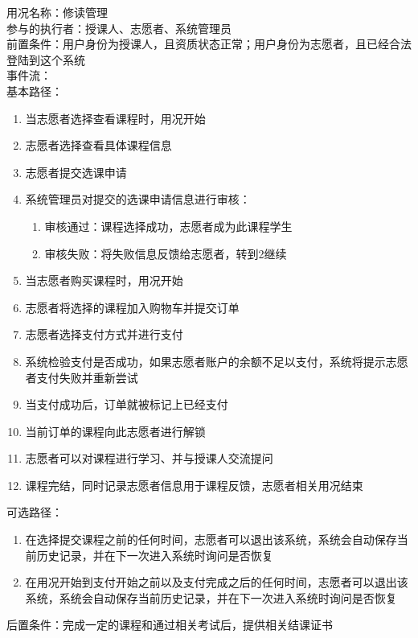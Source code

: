 \begin{framed}
\noindent
用况名称：修读管理\\
参与的执行者：授课人、志愿者、系统管理员\\
前置条件：用户身份为授课人，且资质状态正常；用户身份为志愿者，且已经合法登陆到这个系统\\
事件流：\\
基本路径：
\begin{enumerate}[itemsep=2pt,topsep=0pt,parsep=0pt,itemindent=1em]
    \item 当志愿者选择查看课程时，用况开始
    \item 志愿者选择查看具体课程信息
    \item 志愿者提交选课申请
    \item 系统管理员对提交的选课申请信息进行审核：
    \begin{enumerate}[itemsep=2pt,topsep=0pt,parsep=0pt,itemindent=1em]
          \item 审核通过：课程选择成功，志愿者成为此课程学生
          \item 审核失败：将失败信息反馈给志愿者，转到2继续
      \end{enumerate}
    \item 当志愿者购买课程时，用况开始
    \item 志愿者将选择的课程加入购物车并提交订单
    \item 志愿者选择支付方式并进行支付
    \item 系统检验支付是否成功，如果志愿者账户的余额不足以支付，系统将提示志愿者支付失败并重新尝试
    \item 当支付成功后，订单就被标记上已经支付
    \item 当前订单的课程向此志愿者进行解锁
    \item 志愿者可以对课程进行学习、并与授课人交流提问
    \item 课程完结，同时记录志愿者信息用于课程反馈，志愿者相关用况结束
\end{enumerate}
\noindent
可选路径：\par
         \begin{enumerate}[itemsep=2pt,topsep=0pt,parsep=0pt,itemindent=1em]  \item 在选择提交课程之前的任何时间，志愿者可以退出该系统，系统会自动保存当前历史记录，并在下一次进入系统时询问是否恢复 
         \item 在用况开始到支付开始之前以及支付完成之后的任何时间，志愿者可以退出该系统，系统会自动保存当前历史记录，并在下一次进入系统时询问是否恢复  \end{enumerate} 
后置条件：完成一定的课程和通过相关考试后，提供相关结课证书
\end{framed}

